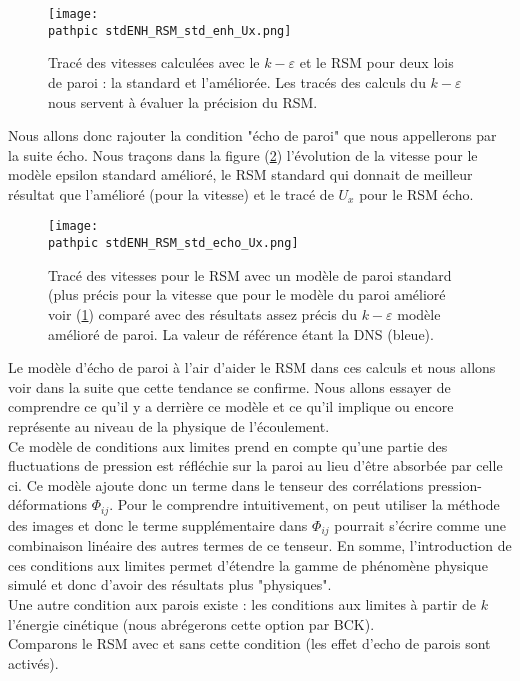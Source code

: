 \documentclass[a4paper,10pt]{article}
\newcommand\pathpic{/home/saura/Documents/Latex_files/Pic/}
\newcommand{\keps}{$k-\varepsilon$}
\begin{document}
\begin{figure}[ht!]
\centering
\texttt{[image: \\pathpic stdENH\_RSM\_std\_enh\_Ux.png]}
\caption{Tracé des vitesses calculées avec le \keps $ $ et le RSM pour deux lois de paroi : la standard et l'améliorée. Les tracés des calculs du \keps $ $ nous servent à évaluer la précision du RSM.}
\label{stdENH_RSM_std_enh_Ux}
\end{figure}

\pagebreak

Nous allons donc rajouter la condition "écho de paroi" que nous appellerons par la suite écho. Nous traçons dans la figure (\ref{stdENH_RSM_std_echo_Ux}) l'évolution de la vitesse pour le modèle epsilon standard amélioré, le RSM standard qui donnait de meilleur résultat que l'amélioré (pour la vitesse) et le tracé de $U_x$ pour le RSM écho.

\begin{figure}[ht!]
\centering
\texttt{[image: \\pathpic stdENH\_RSM\_std\_echo\_Ux.png]}
\caption{Tracé des vitesses pour le RSM avec un modèle de paroi standard (plus précis pour la vitesse que pour le modèle du paroi amélioré voir (\ref{stdENH_RSM_std_enh_Ux}) comparé avec des résultats assez précis du \keps $ $ modèle amélioré de paroi. La valeur de référence étant la DNS (bleue).}
\label{stdENH_RSM_std_echo_Ux}
\end{figure}

Le modèle d'écho de paroi à l'air d'aider le RSM dans ces calculs et nous allons voir dans la suite que cette tendance se confirme. Nous allons essayer de comprendre ce qu'il y a derrière ce modèle et ce qu'il implique ou encore représente au niveau de la physique de l'écoulement.\\
Ce modèle de conditions aux limites prend en compte qu'une partie des fluctuations de pression est réfléchie sur la paroi  au lieu d'être absorbée par celle ci. Ce modèle ajoute donc un terme dans le tenseur des corrélations pression-déformations $\Phi_{ij}$. Pour le comprendre intuitivement, on peut utiliser la méthode des images et donc le terme supplémentaire dans $\Phi_{ij}$ pourrait s'écrire comme une combinaison linéaire des autres termes de ce tenseur. En somme, l'introduction de ces conditions aux limites permet d'étendre la gamme de phénomène physique simulé et donc d'avoir des résultats plus "physiques".\\
Une autre condition aux parois existe : les conditions aux limites à partir de $k$ l'énergie cinétique (nous abrégerons cette option par BCK).\\
Comparons le RSM avec et sans cette condition (les effet d'echo de parois sont activés).
  
\end{document}
